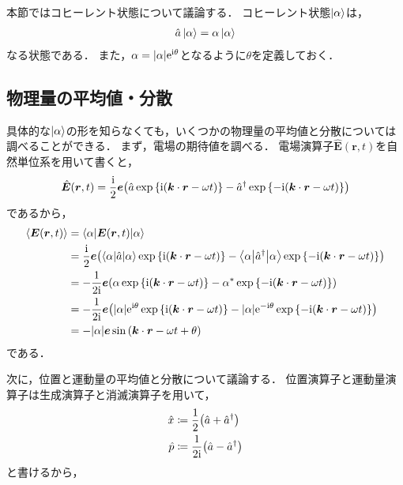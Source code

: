 \documentclass{report}
\begin{document}
  本節ではコヒーレント状態について議論する．
  コヒーレント状態$\ket{\alpha}$は，
  \begin{align}
    \hat{a}\ket{\alpha} = \alpha\ket{\alpha}\label{coherent-def}
  \end{align}
  なる状態である．
  また，$\alpha = \abs{\alpha}\mathrm{e}^{\mathrm{i}\theta}$となるように$\theta$を定義しておく．
  \subsection{物理量の平均値・分散}
    具体的な$\ket{\alpha}$の形を知らなくても，いくつかの物理量の平均値と分散については調べることができる．
    まず，電場の期待値を調べる．
    電場演算子$\hat{\bm{E}}(\bm{r}, t)$を自然単位系を用いて書くと，
    \begin{align}
      \hat{\bm{E}}(\bm{r}, t) = \frac{\mathrm{i}}{2}\bm{e}\qty(\hat{a}\exp\qty{\mathrm{i}(\bm{k}\cdot\bm{r} - \omega t)} - \hat{a}^{\dag}\exp\qty{-\mathrm{i}(\bm{k}\cdot\bm{r} - \omega t)})
    \end{align}
    であるから，
    \begin{align}
      \ev{\bm{E}(\bm{r}, t)} &= \mel**{\alpha}{\bm{E}(\bm{r}, t)}{\alpha} \\ 
      &= \frac{\i}{2}\bm{e}\qty(\mel**{\alpha}{\hat{a}}{\alpha}\exp\qty{\i(\bm{k}\cdot\bm{r} - \omega t)} - \mel**{\alpha}{\hat{a}^{\dag}}{\alpha}\exp\qty{-\i(\bm{k}\cdot\bm{r} - \omega t)}) \\ 
      &= -\frac{1}{2\i}\bm{e}\qty(\alpha\exp\qty{\i(\bm{k}\cdot\bm{r} - \omega t)} - \alpha^*\exp\qty{-\i(\bm{k}\cdot\bm{r} - \omega t)}) \\ 
      &= -\frac{1}{2\i}\bm{e}\qty(\abs{\alpha}\e^{\i\theta}\exp\qty{\i(\bm{k}\cdot\bm{r} - \omega t)} - \abs{\alpha}\e^{-\i\theta}\exp\qty{-\i(\bm{k}\cdot\bm{r} - \omega t)}) \\ 
      &= -\abs{\alpha}\bm{e}\sin\qty(\bm{k}\cdot\bm{r} - \omega t + \theta)
    \end{align}
    である．
    \par
    次に，位置と運動量の平均値と分散について議論する．
    位置演算子と運動量演算子は生成演算子と消滅演算子を用いて，
    \begin{align}
      \hat{x} &\coloneqq \frac{1}{2}\qty(\hat{a} + \hat{a}^{\dag}) \\ 
      \hat{p} &\coloneqq \frac{1}{2\mathrm{i}}\qty(\hat{a} - \hat{a}^{\dag})
    \end{align}
    と書けるから，
\end{document}
